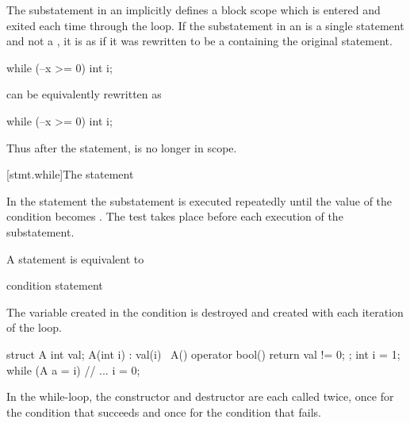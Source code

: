 \pnum
{}%
The substatement in an  implicitly defines
a block scope which is entered and exited each time
through the loop.
If the substatement in an  is
a single statement and not a ,
it is as if it was rewritten to be
a  containing the original statement.
\begin{example}
\begin{codeblock}
while (--x >= 0)
  int i;
\end{codeblock}
can be equivalently rewritten as
\begin{codeblock}
while (--x >= 0) {
  int i;
}
\end{codeblock}
Thus after the  statement,  is no longer in scope.
\end{example}

[stmt.while]{The  statement}%

\pnum
In the  statement the substatement is executed repeatedly
until the value of the condition becomes
. The test takes place before each execution of the
substatement.

\pnum
{}%
A  statement is equivalent to
\begin{ncsimplebnf}
 \terminal{:}\br
\terminal{\{}\br
\bnfindent {} \terminal{(} condition \terminal{)} \terminal{\{}\br
\bnfindent \bnfindent statement\br
\bnfindent \bnfindent {}  \terminal{;}\br
\bnfindent \terminal{\}}\br
\terminal{\}}
\end{ncsimplebnf}
\begin{note}
The variable created in the condition is destroyed and created with each
iteration of the loop.
\begin{example}
\begin{codeblock}
struct A {
  int val;
  A(int i) : val(i) { }
  ~A() { }
  operator bool() { return val != 0; }
};
int i = 1;
while (A a = i) {
  // ...
  i = 0;
}
\end{codeblock}
In the while-loop, the constructor and destructor are each called twice,
once for the condition that succeeds and once for the condition that
fails.
\end{example}
\end{note}

